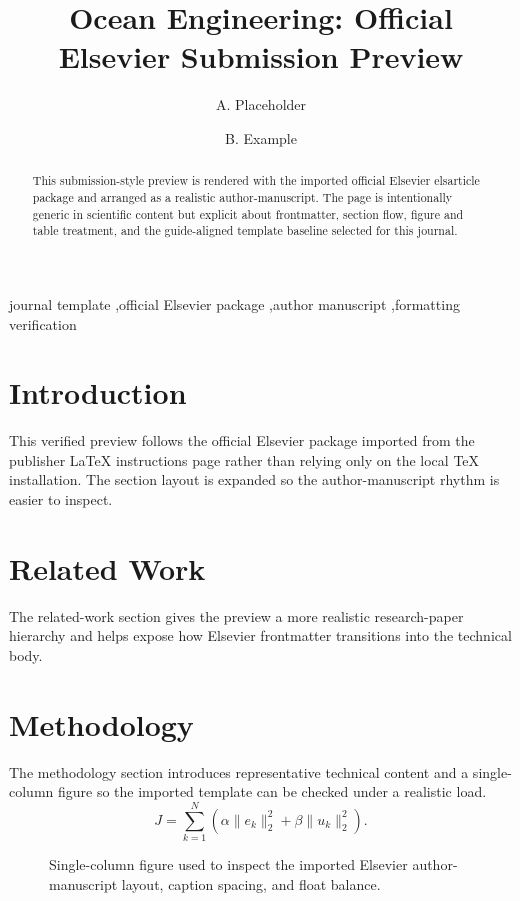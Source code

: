 \documentclass[preprint,12pt,authoryear]{elsarticle}
\begin{document}
\begin{frontmatter}
\title{Ocean Engineering: Official Elsevier Submission Preview}
\author{A. Placeholder}
\author{B. Example}
\address{Department of Verified Templates, Placeholder Institute}
\begin{abstract}
This submission-style preview is rendered with the imported official Elsevier elsarticle package and arranged as a realistic author-manuscript. The page is intentionally generic in scientific content but explicit about frontmatter, section flow, figure and table treatment, and the guide-aligned template baseline selected for this journal.
\end{abstract}
\begin{keyword}
journal template \sep official Elsevier package \sep author manuscript \sep formatting verification
\end{keyword}
\end{frontmatter}
\section{Introduction}
This verified preview follows the official Elsevier package imported from the publisher LaTeX instructions page rather than relying only on the local TeX installation. The section layout is expanded so the author-manuscript rhythm is easier to inspect.
\section{Related Work}
The related-work section gives the preview a more realistic research-paper hierarchy and helps expose how Elsevier frontmatter transitions into the technical body.
\section{Methodology}
The methodology section introduces representative technical content and a single-column figure so the imported template can be checked under a realistic load.
\begin{equation}
J = \sum_{k=1}^{N} \left( \alpha \|e_k\|_2^2 + \beta \|u_k\|_2^2 \right).
\end{equation}
\begin{figure}[t]
\centering
{}
\caption{Single-column figure used to inspect the imported Elsevier author-manuscript layout, caption spacing, and float balance.}
\end{figure}
\end{document}
